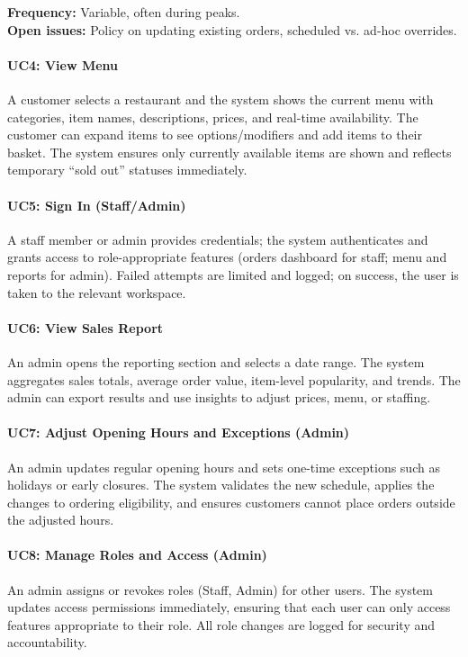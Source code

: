 \documentclass{article}
\begin{document}
\textbf{Frequency:} Variable, often during peaks.\\
\textbf{Open issues:} Policy on updating existing orders, scheduled vs. ad-hoc overrides.

\newpage

\paragraph{UC4: View Menu}  
A customer selects a restaurant and the system shows the current menu with categories, item names, descriptions, prices, and real-time availability. The customer can expand items to see options/modifiers and add items to their basket. The system ensures only currently available items are shown and reflects temporary “sold out” statuses immediately.

\paragraph{UC5: Sign In (Staff/Admin)}  
A staff member or admin provides credentials; the system authenticates and grants access to role-appropriate features (orders dashboard for staff; menu and reports for admin). Failed attempts are limited and logged; on success, the user is taken to the relevant workspace.

\paragraph{UC6: View Sales Report}  
An admin opens the reporting section and selects a date range. The system aggregates sales totals, average order value, item-level popularity, and trends. The admin can export results and use insights to adjust prices, menu, or staffing.

\paragraph{UC7: Adjust Opening Hours and Exceptions (Admin)}  
An admin updates regular opening hours and sets one-time exceptions such as holidays or early closures. The system validates the new schedule, applies the changes to ordering eligibility, and ensures customers cannot place orders outside the adjusted hours.

\paragraph{UC8: Manage Roles and Access (Admin)}  
An admin assigns or revokes roles (Staff, Admin) for other users. The system updates access permissions immediately, ensuring that each user can only access features appropriate to their role. All role changes are logged for security and accountability.
\end{document}
